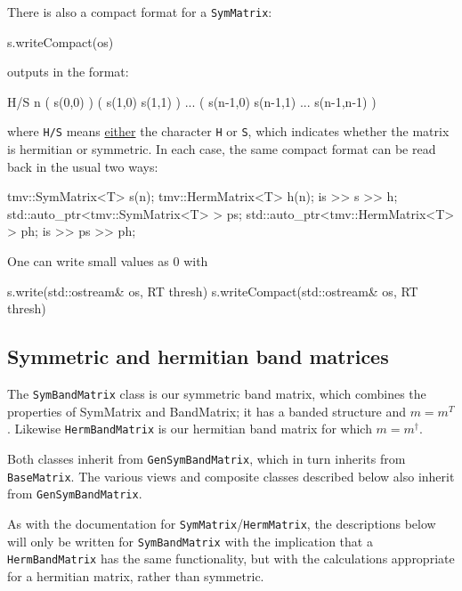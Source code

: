 \documentclass[twoside,letterpaper,11pt]{article}
\renewcommand{\tt}[1]{{\lstinline {#1}}}
\begin{document}
There is also a compact format for a \tt{SymMatrix}:
\begin{tmvcode}
s.writeCompact(os)
\end{tmvcode}
outputs in the format:
\begin{tmvcode}
H/S n 
( s(0,0) )
( s(1,0)  s(1,1) )
...
( s(n-1,0)  s(n-1,1) ... s(n-1,n-1) )
\end{tmvcode}
where \tt{H/S} means \underline{either} the character \tt{H} or \tt{S}, which indicates whether 
the matrix is hermitian or symmetric.
In each case, the same compact format can be read back in the usual two ways:
\begin{tmvcode}
tmv::SymMatrix<T> s(n);
tmv::HermMatrix<T> h(n);
is >> s >> h;
std::auto_ptr<tmv::SymMatrix<T> > ps;
std::auto_ptr<tmv::HermMatrix<T> > ph;
is >> ps >> ph;
\end{tmvcode}
One can write small values as 0 with
\begin{tmvcode}
s.write(std::ostream& os, RT thresh)
s.writeCompact(std::ostream& os, RT thresh)
\end{tmvcode}

\subsection{Symmetric and hermitian band matrices}

The \tt{SymBandMatrix} class is our symmetric band matrix, which combines
the properties of SymMatrix and BandMatrix; it has a banded structure and
$m = m^T$.  Likewise \tt{HermBandMatrix} is our hermitian band matrix for
which $m = m^\dagger$.

Both classes inherit from \tt{GenSymBandMatrix}, which in turn inherits from 
\tt{BaseMatrix}.  The various views and composite classes described below 
also inherit from \tt{GenSymBandMatrix}.

As with the documentation for \tt{SymMatrix}/\tt{HermMatrix}, the descriptions
below will only be written for \tt{SymBandMatrix} with the implication
that a \tt{HermBandMatrix} has the same functionality, but with the calculations
appropriate for a hermitian matrix, rather than symmetric.
\end{document}

